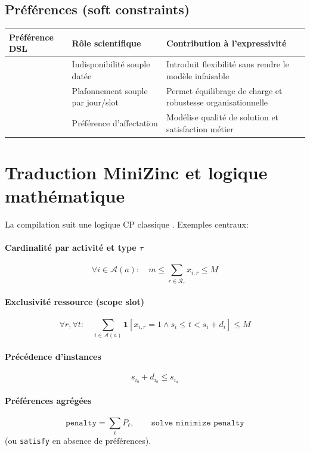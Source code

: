 \documentclass[12pt,a4paper]{article}
\begin{document}
\subsection{Préférences (soft constraints)}
\begin{center}
\small
\begin{tabularx}{\textwidth}{L{0.26\textwidth} X X}
\toprule
\textbf{Préférence DSL} & \textbf{Rôle scientifique} & \textbf{Contribution à l'expressivité} \\
\midrule
\texttt{} & Indisponibilité souple datée & Introduit flexibilité sans rendre le modèle infaisable \\
\texttt{} & Plafonnement souple par jour/slot & Permet équilibrage de charge et robustesse organisationnelle \\
\texttt{} & Préférence d'affectation & Modélise qualité de solution et satisfaction métier \\
\bottomrule
\end{tabularx}
\end{center}

\section{Traduction MiniZinc et logique mathématique}
La compilation suit une logique CP classique \cite{nethercote2007minizinc,marriott1998cp}. Exemples centraux:

\paragraph{Cardinalité par activité et type \(\tau\)}
\[
\forall i\in\mathcal{A}(a):\quad m \le \sum_{r\in\mathcal{R}_{\tau}} x_{i,r} \le M
\]

\paragraph{Exclusivité ressource (scope slot)}
\[
\forall r,\forall t:\quad
\sum_{i\in\mathcal{A}(a)} \mathbf{1}[x_{i,r}=1 \land s_i\le t<s_i+d_i] \le M
\]

\paragraph{Précédence d'instances}
\[
s_{i_b}+d_{i_b}\le s_{i_a}
\]

\paragraph{Préférences agrégées}
\[
\texttt{penalty}=\sum_\ell P_\ell,\qquad
\texttt{solve minimize penalty}
\]
(ou \texttt{satisfy} en absence de préférences).
\end{document}
